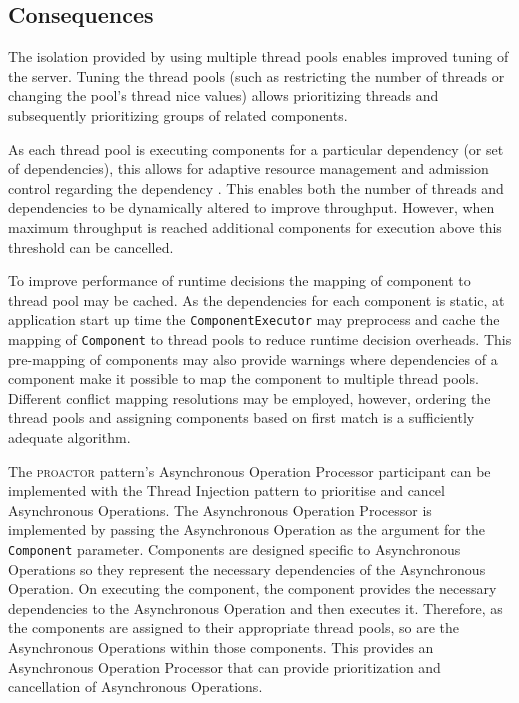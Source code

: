 \documentclass[prodmode]{style/acmlarge}
\begin{document}
\subsection{Consequences}

The isolation provided by using multiple thread pools enables improved tuning of
the server.  Tuning the thread pools (such as restricting the number of threads
or changing the pool's thread nice values) allows prioritizing threads and
subsequently prioritizing groups of related components.

As each thread pool is executing components for a particular dependency (or set
of dependencies), this allows for adaptive resource management and admission
control regarding the dependency \cite{seda}.  This enables both the number of
threads and dependencies to be dynamically altered to improve throughput.
However, when maximum throughput is reached additional components for execution
above this threshold can be cancelled.

To improve performance of runtime decisions the mapping of component to thread
pool may be cached.  As the dependencies for each component is static, at
application start up time the \texttt{ComponentExecutor} may preprocess and
cache the mapping of \texttt{Component} to thread pools to reduce runtime
decision overheads.  This pre-mapping of components may also provide warnings
where dependencies of a component make it possible to map the component to
multiple thread pools.  Different conflict mapping resolutions may be employed,
however, ordering the thread pools and assigning components based on first match
is a sufficiently adequate algorithm.

The \textsc{proactor} pattern's Asynchronous Operation Processor participant can
be implemented with the Thread Injection pattern to prioritise and cancel
Asynchronous Operations.  The Asynchronous Operation Processor is implemented by
passing the Asynchronous Operation as the argument for the \texttt{Component}
parameter.  Components are designed specific to Asynchronous Operations so they
represent the necessary dependencies of the Asynchronous Operation.  On
executing the component, the component provides the necessary dependencies to
the Asynchronous Operation and then executes it.  Therefore, as the components
are assigned to their appropriate thread pools, so are the Asynchronous
Operations within those components.  This provides an Asynchronous Operation
Processor that can provide prioritization and cancellation of Asynchronous
Operations.
\end{document}
